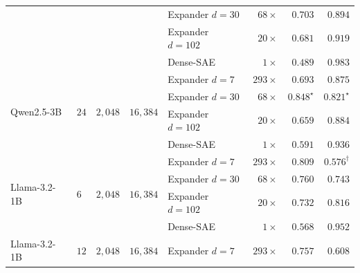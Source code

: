 \documentclass{article}
\theoremstyle{plain}
\theoremstyle{definition}
\theoremstyle{remark}
\begin{document}
\begin{table}[h]
\begin{tabular}{llrrlrrr}
                                      &                       &                         &                                & Expander $d{=}30$   & $68\times$  & $0.703$        & $0.894$ \\
                                      &                       &                         &                                & Expander $d{=}102$  & $20\times$  & $0.681$        & $0.919$ \\
                                      &                       &                         &                                & Dense-SAE           & $1\times$   & $0.489$        & $0.983$ \\
        \midrule
        \multirow{4}{*}{Qwen2.5-3B}   & \multirow{4}{*}{$24$} & \multirow{4}{*}{$2{,}048$} & \multirow{4}{*}{$16{,}384$} & Expander $d{=}7$    & $293\times$ & $0.693$        & $0.875$ \\
                                      &                       &                         &                                & Expander $d{=}30$   & $68\times$  & $0.848^\star$  & $0.821^\star$ \\
                                      &                       &                         &                                & Expander $d{=}102$  & $20\times$  & $0.659$        & $0.884$ \\
                                      &                       &                         &                                & Dense-SAE           & $1\times$   & $0.591$        & $0.936$ \\
        \midrule
        \multirow{4}{*}{Llama-3.2-1B} & \multirow{4}{*}{$6$}  & \multirow{4}{*}{$2{,}048$} & \multirow{4}{*}{$16{,}384$} & Expander $d{=}7$    & $293\times$ & $0.809$        & $0.576^\dagger$ \\
                                      &                       &                         &                                & Expander $d{=}30$   & $68\times$  & $0.760$        & $0.743$ \\
                                      &                       &                         &                                & Expander $d{=}102$  & $20\times$  & $0.732$        & $0.816$ \\
                                      &                       &                         &                                & Dense-SAE           & $1\times$   & $0.568$        & $0.952$ \\
        \midrule
        \multirow{4}{*}{Llama-3.2-1B} & \multirow{4}{*}{$12$} & \multirow{4}{*}{$2{,}048$} & \multirow{4}{*}{$16{,}384$} & Expander $d{=}7$    & $293\times$ & $0.757$        & $0.608$ \\

\end{tabular}
\end{table}
\end{document}
